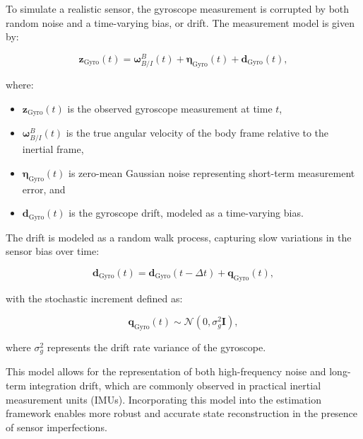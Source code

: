 To simulate a realistic sensor, the gyroscope measurement is corrupted by both random noise and a time-varying bias, or drift. The measurement model is given by:

\begin{equation}
    \mathbf{z}_{\text{Gyro}}(t) = \boldsymbol{\omega}^B_{B/I}(t) + \boldsymbol{\eta}_{\text{Gyro}}(t) + \mathbf{d}_{\text{Gyro}}(t),
\end{equation}

where:
\begin{itemize}
    \item $\mathbf{z}_{\text{Gyro}}(t)$ is the observed gyroscope measurement at time $t$,
    \item $\boldsymbol{\omega}^B_{B/I}(t)$ is the true angular velocity of the body frame relative to the inertial frame,
    \item $\boldsymbol{\eta}_{\text{Gyro}}(t)$ is zero-mean Gaussian noise representing short-term measurement error, and
    \item $\mathbf{d}_{\text{Gyro}}(t)$ is the gyroscope drift, modeled as a time-varying bias.
\end{itemize}

The drift is modeled as a random walk process, capturing slow variations in the sensor bias over time:

\begin{equation}
    \mathbf{d}_{\text{Gyro}}(t) = \mathbf{d}_{\text{Gyro}}(t - \Delta t) + \mathbf{q}_{\text{Gyro}}(t),
\end{equation}

with the stochastic increment defined as:

\begin{equation}
    \mathbf{q}_{\text{Gyro}}(t) \sim \mathcal{N}(0, \sigma_g^2 \mathbf{I}),
\end{equation}

where $\sigma_g^2$ represents the drift rate variance of the gyroscope.

This model allows for the representation of both high-frequency noise and long-term integration drift, which are commonly observed in practical inertial measurement units (IMUs). Incorporating this model into the estimation framework enables more robust and accurate state reconstruction in the presence of sensor imperfections.





\label{sec:css}

